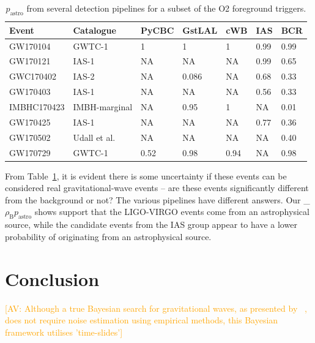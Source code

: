 \documentclass[%
 amsmath,amssymb,
 aps,
twocolumn
]{revtex4}
\newcommand{\mathcmd}[1]{{\sc \relax\ifmmode#1\else $#1$\fi}\xspace}
\newcommand{\bcr}{\mathcmd{\rho_\text{B}}}
\newcommand{\pastro}{\relax\ifmmode{p_\text{astro}}\else $p_\text{astro}$\fi\xspace}
\newcommand{\av}[1]{\textcolor{orange}{[AV: #1]}}
\newcommand{\rs}[1]{\textcolor{red}{[RS: #1]}}
\begin{document}
\begin{table}
\caption[\rs{Put BCR first and put a box around it, indicating that this is the new results that people should focus on}\pastro for various O2 foreground triggers]{\label{tab:O2significancesWObcr}\pastro from several detection pipelines for a subset of the O2 foreground triggers.}

\centering
\begin{tabular}{lllllll} 
\hline
\textbf{Event} & \textbf{Catalogue} & \textbf{PyCBC} & \textbf{GstLAL} & \textbf{cWB} & \textbf{IAS} & \textbf{BCR} \\ 
\hline
GW170104 & GWTC-1 & 1 & 1 & 1 & 0.99 & 0.99 \\
GW170121 & IAS-1 & NA & NA & NA & 0.99 & 0.65 \\
GWC170402 & IAS-2 & NA & 0.086 & NA & 0.68 & 0.33 \\
GW170403 & IAS-1 & NA & NA & NA & 0.56 & 0.33 \\
IMBHC170423 & IMBH-marginal & NA & 0.95 & 1 & NA & 0.01 \\
GW170425 & IAS-1 & NA & NA & NA & 0.77 & 0.36 \\
GW170502 & Udall et al. & NA & NA & NA & NA & 0.40 \\
GW170729 & GWTC-1 & 0.52 & 0.98 & 0.94 & NA & 0.98
\end{tabular}
\end{table}



From Table~\ref{tab:O2significancesWObcr}, it is evident there is some uncertainty if these events can be considered real gravitational-wave events -- are these events significantly different from the background or not? The various pipelines have different answers. Our \bcr \pastro shows support that the LIGO-VIRGO events come from an astrophysical source, while the candidate events from the IAS group appear to have a lower probability of originating from an astrophysical source.







\section{\label{sec:Conclusion}Conclusion}


\av{Although a true Bayesian search for gravitational waves, as presented by ~\cite{BCR2}, does not require noise estimation using empirical methods, this Bayesian framework utilises 'time-slides'}
\end{document}
